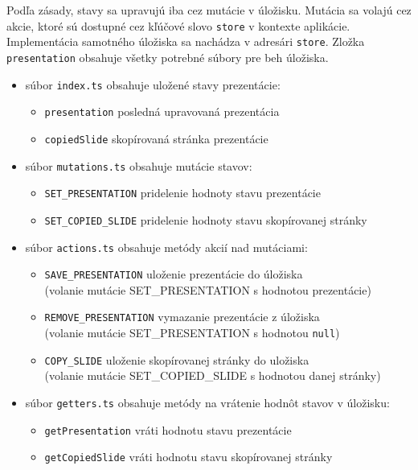 Podľa zásady, stavy sa upravujú iba cez mutácie v úložisku. Mutácia sa volajú cez akcie, ktoré sú dostupné cez kľúčové slovo \texttt{store} v kontexte aplikácie. Implementácia samotného úložiska sa nachádza v adresári \texttt{store}. Zložka \texttt{presentation} obsahuje všetky potrebné súbory pre beh úložiska.

    \begin{itemize}
        \item súbor \texttt{index.ts} obsahuje uložené stavy prezentácie:
        \begin{itemize}
            \item \texttt{presentation} posledná upravovaná prezentácia
            \item \texttt{copiedSlide} skopírovaná stránka prezentácie
        \end{itemize}
        
        \item súbor \texttt{mutations.ts} obsahuje mutácie stavov:
        \begin{itemize}
            \item \texttt{SET\_PRESENTATION} pridelenie hodnoty stavu prezentácie
            \item \texttt{SET\_COPIED\_SLIDE} pridelenie hodnoty stavu skopírovanej stránky
        \end{itemize}
        
        \item súbor \texttt{actions.ts} obsahuje metódy akcií nad mutáciami:
        \begin{itemize}
            \item \texttt{SAVE\_PRESENTATION} uloženie prezentácie do úložiska\\(volanie mutácie SET\_PRESENTATION s hodnotou prezentácie)
            \item \texttt{REMOVE\_PRESENTATION} vymazanie prezentácie z úložiska\\(volanie mutácie SET\_PRESENTATION s hodnotou \texttt{null})
            \item \texttt{COPY\_SLIDE} uloženie skopírovanej stránky do uložiska\\(volanie mutácie SET\_COPIED\_SLIDE s hodnotou danej stránky)
        \end{itemize}
        
        \item súbor \texttt{getters.ts} obsahuje metódy na vrátenie hodnôt stavov v úložisku:
        \begin{itemize}
            \item \texttt{getPresentation} vráti hodnotu stavu prezentácie
            \item \texttt{getCopiedSlide} vráti hodnotu stavu skopírovanej stránky
        \end{itemize}
    \end{itemize}
    
